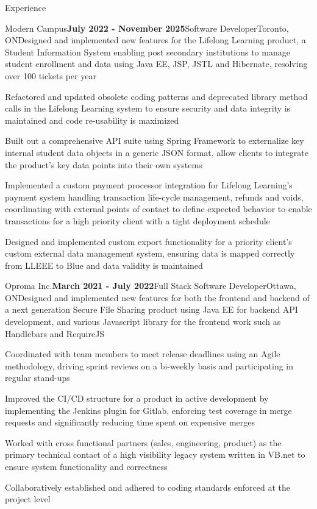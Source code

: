 \documentclass{resume} %
\begin{document}
\begin{rSection}{Experience}
\begin{rSubsection}{Modern Campus}{\textbf{July 2022 - November 2025}}{Software Developer}{Toronto, ON}{Designed and implemented new features for the Lifelong Learning product, a Student Information System enabling post secondary institutions to manage  student enrollment and data using Java EE, JSP, JSTL and Hibernate, resolving over 100 tickets per year}
\item Refactored and updated obsolete coding patterns and deprecated library method calls in the Lifelong Learning system to ensure security and data integrity is maintained and code re-usability is maximized
\item Built out a comprehensive API suite using Spring Framework to externalize key internal student data objects in a generic JSON format, allow clients to integrate the product's key data points into their own systems
\item Implemented a custom payment processor integration for Lifelong Learning's payment system handling transaction life-cycle management, refunds and voids, coordinating with external points of contact to define expected behavior to enable transactions for a high priority client with a tight deployment schedule
\item Designed and implemented custom export functionality for a priority client's custom external data management system, ensuring data is mapped correctly from LLEEE to Blue and data validity is maintained 
\end{rSubsection}

\begin{rSubsection}{Oproma Inc.}{\textbf{March 2021 - July 2022}}{Full Stack Software Developer}{Ottawa, ON}{Designed and implemented new features for both the frontend and backend of a next generation Secure File Sharing product using Java EE for backend API development, and various Javascript library for the frontend work such as Handlebars and RequireJS}
\item Coordinated with team members to meet release deadlines using an Agile methodology, driving sprint reviews on a bi-weekly basis and participating in regular stand-ups
\item Improved the CI/CD structure for a product in active development by implementing the Jenkins plugin for Gitlab, enforcing test coverage in merge requests and significantly reducing time spent on expensive merges
\item Worked with cross functional partners (sales, engineering, product) as the primary technical contact of a high visibility legacy system written in VB.net to ensure system functionality and correctness
\item Collaboratively established and adhered to coding standards enforced at the project level
\end{rSubsection}


\end{rSection}
\end{document}
